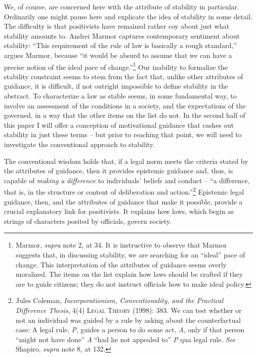 We, of course, are concerned here with the attribute of stability in
particular. Ordinarily one might pause here and explicate the idea of
stability in some detail. The difficulty is that positivists have
remained rather coy about just what stability amounts to. Andrei Marmor
captures contemporary sentiment about stability: ``This requirement of
the rule of law is basically a rough standard,'' argues Marmor, because
``it would be absurd to assume that we can have a precise notion of the
ideal pace of change.''\footnote{Marmor, \emph{supra} note 2\textsc{,}
  at 34. It is instructive to observe that Marmor suggests that, in
  discussing stability, we are searching for an ``ideal'' pace of
  change. This interpretation of the attributes of guidance seems overly
  moralized. The items on the list explain how laws should be crafted if
  they are to guide citizens; they do not instruct officials how to make
  ideal policy.} Our inability to formalize the stability constraint
seems to stem from the fact that, unlike other attributes of guidance,
it is difficult, if not outright impossible to define stability in the
abstract. To characterize a law as stable seems, in some fundamental
way, to involve an assessment of the conditions in a society, and the
expectations of the governed, in a way that the other items on the list
do not. In the second half of this paper I will offer a conception of
motivational guidance that cashes out stability in just these terms --
but prior to reaching that point, we will need to investigate the
conventional approach to stability.

The conventional wisdom holds that, if a legal norm meets the criteria
stated by the attributes of guidance, then it provides epistemic
guidance and, thus, is capable of \emph{making a difference} to
individuals' beliefs and conduct -- ``a difference, that is, in the
structure or content of deliberation and action.''\footnote{Jules
  Coleman, \emph{Incorporationism, Conventionality, and the Practical
  Difference Thesis}, 4(4) \textsc{Legal Theory (1998): 383.} We can
  test whether or not an individual was guided by a rule by asking about
  the counterfactual case: A legal rule, \emph{P}, guides a person to do
  some act, \emph{A}, only if that person ``might not have done''
  \emph{A} ``had he not appealed to'' \emph{P} qua legal rule.
  \emph{See} Shapiro, \emph{supra} note 8, at 132.} Epistemic legal
guidance, then, and the attributes of guidance that make it possible,
provide a crucial explanatory link for positivists. It explains how
laws, which begin as strings of characters posited by officials, govern
society.

